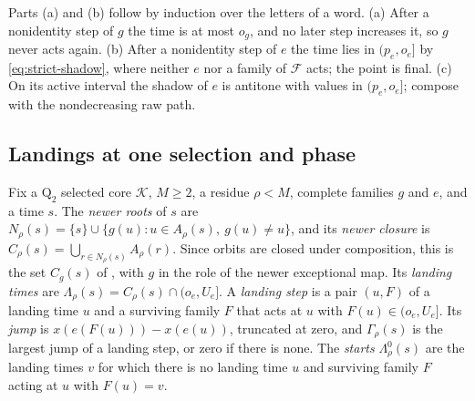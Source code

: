 \begin{outline}
Parts (a) and (b) follow by induction over the letters of a word. (a) After a
nonidentity step of $g$ the time is at most $o_g$, and no later step increases it, so
$g$ never acts again. (b) After a nonidentity step of $e$ the time lies in
$(p_e,o_e]$ by \eqref{eq:strict-shadow}, where neither $e$ nor a family of
$\mathcal F$ acts; the point is final. (c) On its active interval the shadow of $e$ is
antitone with values in $(p_e,o_e]$; compose with the nondecreasing raw path.
\end{outline}

\subsection{Landings at one selection and phase}

\begin{definition}\label{def:landings}
Fix a $\mathrm Q_2$ selected core $\mathcal K$, $M\ge2$, a residue $\rho<M$, complete
families $g$ and $e$, and a time $s$. The \emph{newer roots} of $s$ are
$N_\rho(s)=\{s\}\cup\{g(u):u\in A_\rho(s),\ g(u)\ne u\}$, and its \emph{newer closure}
is $C_\rho(s)=\bigcup_{r\in N_\rho(s)}A_\rho(r)$. Since orbits are closed under
composition, this is the set $C_g(s)$ of \cite[Proposition~3.7(b)]{SourceCovers2026},
with $g$ in the role of the newer exceptional map. Its \emph{landing times} are
$\Lambda_\rho(s)=C_\rho(s)\cap(o_e,U_e]$. A \emph{landing step} is a pair $(u,F)$ of a
landing time $u$ and a surviving family $F$ that acts at $u$ with
$F(u)\in(o_e,U_e]$. Its \emph{jump} is $x(e(F(u)))-x(e(u))$, truncated at zero, and
$\Gamma_\rho(s)$ is the largest jump of a landing step, or zero if there is none.
The \emph{starts} $\Lambda^0_\rho(s)$ are the landing times $v$ for which there is no
landing time $u$ and surviving family $F$ acting at $u$ with $F(u)=v$.
\end{definition}

